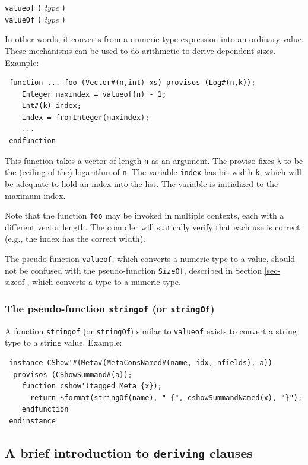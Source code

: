 \documentclass[twoside,letterpaper]{article}
\newcommand{\hm}{\hspace*{1em}}
\newcommand{\te}[1]{\texttt{#1}}
\newcommand{\nterm}[1]{\emph{#1}}
\newcommand{\term}[1]{\texttt{#1}}
\newcommand{\alt}{{$\mid$}}
\newcommand{\gram}[2]{    \hm\makebox[10em][l]{\it #1}\makebox[1.5em][l]{::=}    #2}
\newcommand{\gramalt}[1]{ \hm\makebox[10em][l]{      }\makebox[1.5em][l]{\alt}   #1}
\begin{document}
\gram{exprPrimary}{ \term{valueof} \term{(} \nterm{type} \term{)}} \\
\gramalt { \term{valueOf} \term{(} \nterm{type} \term{)}}
                 
In other words, it converts from a numeric type expression into an
ordinary value.  These mechanisms can be used to do arithmetic to
derive dependent sizes. Example:
\begin{verbatim}
 function ... foo (Vector#(n,int) xs) provisos (Log#(n,k));
    Integer maxindex = valueof(n) - 1;
    Int#(k) index;
    index = fromInteger(maxindex);
    ...
 endfunction
\end{verbatim}
This function takes a vector of length \texttt{n} as an argument.  The
proviso fixes \texttt{k} to be the (ceiling of the) logarithm of \texttt{n}.
The variable \texttt{index} has bit-width \texttt{k}, which will be adequate
to hold an index into the list.  The variable is initialized to the
maximum index.

Note that the function \texttt{foo} may be invoked in multiple contexts,
each with a different vector length.  The compiler will statically
verify that each use is correct (e.g., the index has the correct
width).

The pseudo-function \texttt{valueof}, which converts a numeric type to a
value, should not be confused with the pseudo-function \texttt{SizeOf},
described in Section {\ref{sec-sizeof}}, which converts a type to a
numeric type.

\subsubsection{The pseudo-function \te{stringof} (or \te{stringOf})}

A function \texttt{stringof} (or \texttt{stringOf})
similar to \te{valueof}
exists to convert a string type to a string value.
Example:
\begin{verbatim}
 instance CShow'#(Meta#(MetaConsNamed#(name, idx, nfields), a))
  provisos (CShowSummand#(a));
    function cshow'(tagged Meta {x});
      return $format(stringOf(name), " {", cshowSummandNamed(x), "}");
    endfunction
 endinstance
\end{verbatim}


\subsection{A brief introduction to \texttt{deriving} clauses}
\end{document}
